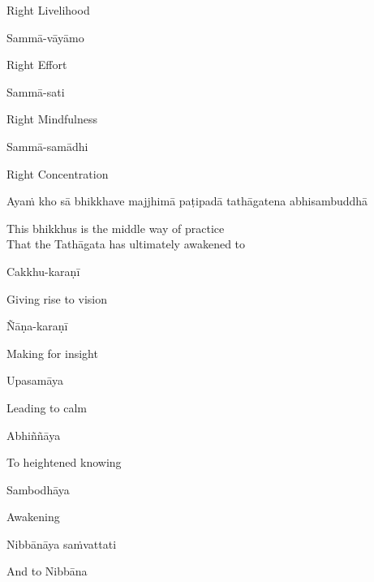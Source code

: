 \begin{english}
  Right Livelihood
\end{english}

Sammā-vāyāmo

\begin{english}
  Right Effort
\end{english}

Sammā-sati

\begin{english}
  Right Mindfulness
\end{english}

Sammā-samādhi

\begin{english}
  Right Concentration
\end{english}

\begin{pali-hang}
  Ayaṁ kho sā bhikkhave majjhimā paṭipadā tathāgatena abhisambuddhā
\end{pali-hang}

\begin{english}
  This bhikkhus is the middle way of practice\\
  That the Tathāgata has ultimately awakened to
\end{english}

Cakkhu-karaṇī

\begin{english}
  Giving rise to vision
\end{english}

Ñāṇa-karaṇī

\begin{english}
  Making for insight
\end{english}

Upasamāya

\begin{english}
  Leading to calm
\end{english}

Abhiññāya

\begin{english}
  To heightened knowing
\end{english}

Sambodhāya

\begin{english}
  Awakening
\end{english}

Nibbānāya saṁvattati

\begin{english}
  And to Nibbāna
\end{english}

